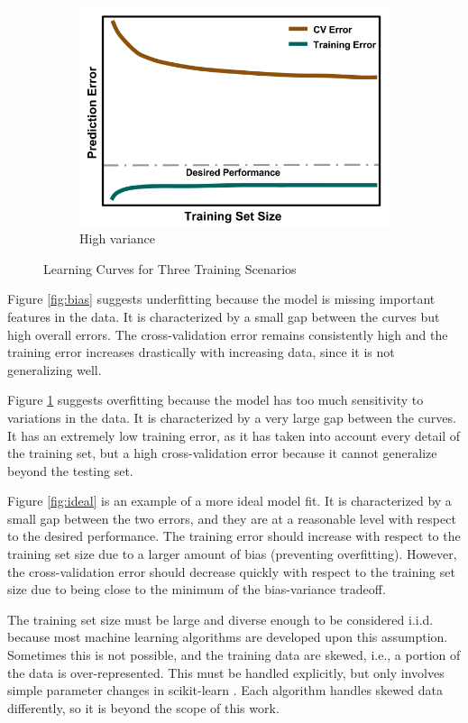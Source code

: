 \begin{figure}[!hp]
\begin{subfigure}[h]{0.65\linewidth}
    \includegraphics[width=\linewidth]{./chapters/litrev/LearningCurve-variance.png}
    \caption{High variance}
    \label{fig:variance}
  \end{subfigure}
  \caption{Learning Curves for Three Training Scenarios}
  \label{fig:learning}
\end{figure}

Figure \ref{fig:bias} suggests underfitting because the model is missing
important features in the data. It is characterized by a small gap between the
curves but high overall errors. The cross-validation error remains consistently
high and the training error increases drastically with increasing data, since
it is not generalizing well. 

Figure \ref{fig:variance} suggests overfitting because the model has too much
sensitivity to variations in the data. It is characterized by a very large gap
between the curves. It has an extremely low training error, as it has taken
into account every detail of the training set, but a high cross-validation
error because it cannot generalize beyond the testing set. 

Figure \ref{fig:ideal} is an example of a more ideal model fit. It is
characterized by a small gap between the two errors, and they are at a
reasonable level with respect to the desired performance.  The training error
should increase with respect to the training set size due to a larger amount of
bias (preventing overfitting). However, the cross-validation error should decrease
quickly with respect to the training set size due to being close to the minimum
of the bias-variance tradeoff. 

The training set size must be large and diverse enough to be considered
\gls{i.i.d.} because most machine learning algorithms are developed upon this
assumption. Sometimes this is not possible, and the training data are skewed,
i.e., a portion of the data is over-represented. This must be handled
explicitly, but only involves simple parameter changes in scikit-learn
\cite{scikit}.  Each algorithm handles skewed data differently, so it is
beyond the scope of this work. 

